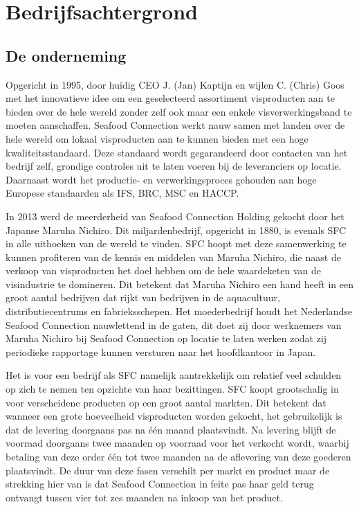 \chapter{Bedrijfsachtergrond}
\section{De onderneming}
Opgericht in 1995, door huidig CEO J. (Jan) Kaptijn en wijlen C. (Chris) Goos met het innovatieve idee om een geselecteerd assortiment visproducten aan te bieden over de hele wereld zonder zelf ook maar een enkele visverwerkingsband te moeten aanschaffen. Seafood Connection werkt nauw samen met landen over de hele wereld om lokaal visproducten aan te kunnen bieden met een hoge kwaliteitsstandaard. Deze standaard wordt gegarandeerd door contacten van het bedrijf zelf, grondige controles uit te laten voeren bij de leveranciers op locatie. Daarnaast wordt het productie- en verwerkingsproces gehouden aan hoge Europese standaarden als IFS, BRC, MSC en HACCP. \citep{sfcwebsite}

In 2013 werd de meerderheid van Seafood Connection Holding gekocht door het Japanse Maruha Nichiro. Dit miljardenbedrijf, opgericht in 1880, is evenals SFC in alle uithoeken van de wereld te vinden. SFC hoopt met deze samenwerking te kunnen profiteren van de kennis en middelen van Maruha Nichiro, die naast de verkoop van visproducten het doel hebben om de hele waardeketen van de visindustrie te domineren. Dit betekent dat Maruha Nichiro een hand heeft in een groot aantal bedrijven dat rijkt van bedrijven in de aquacultuur, distributiecentrums en fabrieksschepen. Het moederbedrijf houdt het Nederlandse Seafood Connection nauwlettend in de gaten, dit doet zij door werknemers van Maruha Nichiro bij Seafood Connection op locatie te laten werken zodat zij periodieke rapportage kunnen versturen naar het hoofdkantoor in Japan. \citep{sfcwebsite,Visserijnieuws}

\label{beschr:activiteiten}
Het is voor een bedrijf als SFC namelijk aantrekkelijk om relatief veel schulden op zich te nemen ten opzichte van haar bezittingen. SFC koopt grootschalig in voor verscheidene producten op een groot aantal markten. Dit betekent dat wanneer een grote hoeveelheid visproducten worden gekocht, het gebruikelijk is dat de levering doorgaans pas na één maand plaatsvindt. Na levering blijft de voorraad doorgaans twee maanden op voorraad voor het verkocht wordt, waarbij betaling van deze order één tot twee maanden na de aflevering van deze goederen plaatsvindt. De duur van deze fasen verschilt per markt en product maar de strekking hier van is dat Seafood Connection in feite pas haar geld terug ontvangt tussen vier tot zes maanden na inkoop van het product. 


